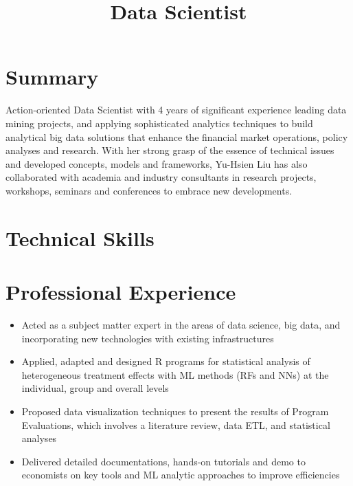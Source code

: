 \documentclass[12pt,a4paper,roman]{moderncv}        %
\title{Data Scientist\vspace*{15pt}}                               %
\begin{document}

\makecvtitle

\vspace*{-10mm}


\section{Summary}
\medskip
Action-oriented Data Scientist with 4 years of significant experience leading data mining projects, and applying sophisticated analytics techniques to build analytical big data solutions that enhance the financial market operations, policy analyses and research. With her strong grasp of the essence of technical issues and developed concepts, models and frameworks, Yu-Hsien Liu has also collaborated with academia and industry consultants in research projects, workshops, seminars and conferences to embrace new developments.




\section{Technical Skills}


\renewcommand{\labelitemi}{\textbullet}


\section{Professional Experience}
\begin{itemize}
    \item Acted as a subject matter expert in the areas of data science, big data, and incorporating new technologies with existing infrastructures
    \item Applied, adapted and designed R programs for statistical analysis of heterogeneous treatment effects with ML methods (RFs and NNs) at the individual, group and overall levels
    \item Proposed data visualization techniques to present the results of Program Evaluations, which involves a literature review, data ETL, and statistical analyses
    \item Delivered detailed documentations, hands-on tutorials and demo to economists on key tools and ML analytic approaches to improve efficiencies
\end{itemize}
\end{document}
